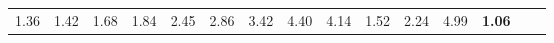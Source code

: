\begin{tabular}{ll|rrrrrrrrr|rrrr}
  


  
  1.36 & 1.42 & 1.68 & 1.84 & 2.45 & 2.86 & 3.42 & 4.40 & 4.14 & 1.52 & 2.24 & 4.99 & \textbf{1.06} \\


\end{tabular}
